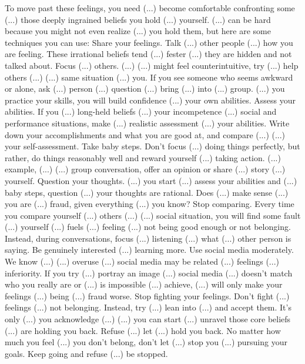 \documentclass[14pt,a4paper]{extarticle}
\begin{document}
To move past these feelings, you need (...) become comfortable confronting some (...) those deeply ingrained beliefs you hold (...) yourself. (...) can be hard because you might not even realize (...) you hold them, but here are some techniques you can use:
\newline\newline 
Share your feelings. Talk (...) other people (...) how you are feeling. These irrational beliefs tend (...) fester (...) they are hidden and not talked about.
Focus (...) others. (...) (...) might feel counterintuitive, try (...) help others (...) (...) same situation (...) you. If you see someone who seems awkward or alone, ask (...) person (...) question (...) bring (...) into (...) group. (...) you practice your skills, you will build confidence (...) your own abilities.
Assess your abilities. If you (...) long-held beliefs (...) your incompetence (...) social and performance situations, make (...) realistic assessment (...) your abilities. Write down your accomplishments and what you are good at, and compare (...) (...) your self-assessment.
Take baby steps. Don't focus (...) doing things perfectly, but rather, do things reasonably well and reward yourself (...) taking action. (...) example, (...) (...) group conversation, offer an opinion or share (...) story (...) yourself.
Question your thoughts. (...) you start (...) assess your abilities and (...) baby steps, question (...) your thoughts are rational. Does (...) make sense (...) you are (...) fraud, given everything (...) you know?
Stop comparing. Every time you compare yourself (...) others (...) (...) social situation, you will find some fault (...) yourself (...) fuels (...) feeling (...) not being good enough or not belonging. Instead, during conversations, focus (...) listening (...) what (...) other person is saying. Be genuinely interested (...) learning more.
Use social media moderately. We know (...) (...) overuse (...) social media may be related (...) feelings (...) inferiority. If you try (...) portray an image (...) social media (...) doesn't match who you really are or (...) is impossible (...) achieve, (...) will only make your feelings (...) being (...) fraud worse.
Stop fighting your feelings. Don't fight (...) feelings (...) not belonging. Instead, try (...) lean into (...) and accept them. It's only (...) you acknowledge (...) (...) you can start (...) unravel those core beliefs (...) are holding you back.
Refuse (...) let (...) hold you back. No matter how much you feel (...) you don't belong, don't let (...) stop you (...) pursuing your goals. Keep going and refuse (...) be stopped.
\end{document}
